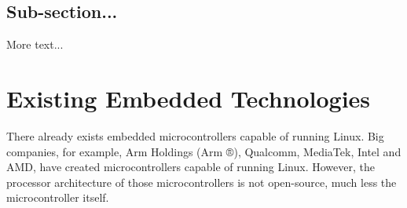 \subsection{Sub-section...}

More text...

\section{Existing Embedded Technologies}
\label{sec:existing_embedded_technologies}
There already exists embedded microcontrollers capable of running Linux. Big companies, for example, Arm Holdings (Arm ®), Qualcomm, MediaTek, Intel and AMD, have created microcontrollers capable of running Linux. However, the processor architecture of those microcontrollers is not open-source, much less the microcontroller itself.